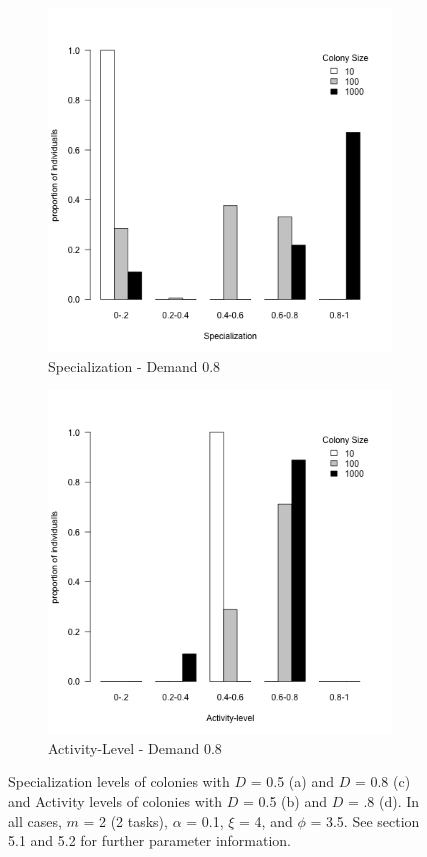 \documentclass[a4paper]{article}
\begin{document}
\begin{figure}[!ht]
     \begin{subfigure}[b]{0.45\linewidth}
      \includegraphics[width=\linewidth]{2_Tasks_Spe_and_8_demand}
      \caption{Specialization - Demand 0.8}\label{fig:2b}
    \end{subfigure}
    \hfill
    \begin{subfigure}[b]{0.45\linewidth}
      \includegraphics[width=\linewidth]{2_Tasks_Act_and_8_demand}
      \caption{Activity-Level - Demand 0.8}\label{fig:2d}
     \end{subfigure}
     \caption{Specialization levels of colonies with $D$ = 0.5 (a) and $D$ = 0.8 (c) and Activity levels of colonies with $D$ = 0.5 (b) and $D$ = .8 (d). In all cases, $m$ = 2 (2 tasks), $\alpha$ = 0.1, $\xi$ = 4, and $\phi$ = 3.5.  See section 5.1 and 5.2 for further parameter information.}\label{fig:2}



\end{figure}
\end{document}
